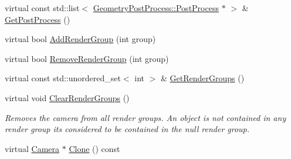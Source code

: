 \begin{DoxyCompactItemize}
virtual const std\+::list$<$ \mbox{\hyperlink{class_geometry_engine_1_1_geometry_post_process_1_1_post_process}{Geometry\+Post\+Process\+::\+Post\+Process}} $\ast$ $>$ \& \mbox{\hyperlink{class_geometry_engine_1_1_geometry_world_item_1_1_geometry_camera_1_1_camera_a1ef9d25c964f8686f3da5594e0184d58}{Get\+Post\+Process}} ()
\item 
virtual bool \mbox{\hyperlink{class_geometry_engine_1_1_geometry_world_item_1_1_geometry_camera_1_1_camera_a0a76192f4a629a8b6f7a1900078869de}{Add\+Render\+Group}} (int group)
\item 
virtual bool \mbox{\hyperlink{class_geometry_engine_1_1_geometry_world_item_1_1_geometry_camera_1_1_camera_aea364f3b5f2aecabcb240825988d6bee}{Remove\+Render\+Group}} (int group)
\item 
virtual const std\+::unordered\+\_\+set$<$ int $>$ \& \mbox{\hyperlink{class_geometry_engine_1_1_geometry_world_item_1_1_geometry_camera_1_1_camera_ab61fd806095dfb39141289e7b7d25dab}{Get\+Render\+Groups}} ()
\item 
\mbox{\label{class_geometry_engine_1_1_geometry_world_item_1_1_geometry_camera_1_1_camera_ad8e59031794a9fd3f84458828942f2c9}} 
virtual void \mbox{\hyperlink{class_geometry_engine_1_1_geometry_world_item_1_1_geometry_camera_1_1_camera_ad8e59031794a9fd3f84458828942f2c9}{Clear\+Render\+Groups}} ()
\begin{DoxyCompactList}\small\item\em Removes the camera from all render groups. An object is not contained in any render group it\textquotesingle{}s considered to be contained in the null render group. \end{DoxyCompactList}\item 
virtual \mbox{\hyperlink{class_geometry_engine_1_1_geometry_world_item_1_1_geometry_camera_1_1_camera}{Camera}} $\ast$ \mbox{\hyperlink{class_geometry_engine_1_1_geometry_world_item_1_1_geometry_camera_1_1_camera_a53b37943c1929fde7396c66a36fb3c52}{Clone}} () const
\end{DoxyCompactItemize}
